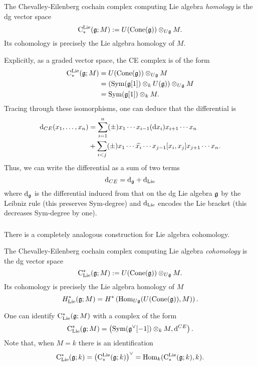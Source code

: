 \documentclass[11pt]{amsart}
\begin{document}
\begin{dfn}
The Chevalley-Eilenberg cochain complex computing Lie algebra {\em homology} is the dg vector space
\[
{\rm C}^{\rm Lie}_*(\mathfrak g ; M) := U({\rm Cone}(\mathfrak g)) \otimes_{U \mathfrak g} M .
\] 
Its cohomology is precisely the Lie algebra homology of $M$.
\end{dfn}

\begin{rmk}
Explicitly, as a graded vector space, the CE complex is of the form
\begin{align*}
{\rm C}^{\rm Lie}_*(\mathfrak g ; M) & = U({\rm Cone}(\mathfrak g)) \otimes_{U \mathfrak g} M  \\ & = \left({\rm Sym}(\mathfrak g[1]) \otimes_k U(\mathfrak g)\right) \otimes_{U \mathfrak g} M \\ &= {\rm Sym}(\mathfrak g[1]) \otimes_k M .
\end{align*}
Tracing through these isomorphisms, one can deduce that the differential is
\begin{align*}
{\rm d}_{CE} (x_1,\ldots, x_n) & = \sum_{i = 1}^n (\pm) x_1 \cdots x_{i-1} ({\rm d} x_i) x_{i+1} \cdots x_n \\ & + \sum_{i < j} (\pm) x_1\cdots \widehat{x_i} \cdots x_{j-1} [x_i,x_j] x_{j+1} \cdots x_n .
\end{align*}
Thus, we can write the differential as a sum of two terms $${\rm d}_{CE} = {\rm d}_{\mathfrak g} + {\rm d}_{\rm Lie}$$ where ${\rm d}_{\mathfrak g}$ is the differential induced from that on the dg Lie algebra $\mathfrak g$ by the Leibniz rule (this preserves Sym-degree) and ${\rm d}_{\rm Lie}$ encodes the Lie bracket (this decreases Sym-degree by one). 
\end{rmk}

\subsubsection{}

There is a completely analogous construction for Lie algebra cohomology. 

\begin{dfn}
The Chevalley-Eilenberg cochain complex computing Lie algebra {\em cohomology} is the dg vector space
\[
{\rm C}_{{\rm Lie}}^*(\mathfrak g ; M) := U({\rm Cone}(\mathfrak g)) \otimes_{U \mathfrak g} M .
\] 
Its cohomology is precisely the Lie algebra homology of $M$
\[
H_{\rm Lie}^*(\mathfrak g ; M) = H^*\left({\rm Hom}_{U \mathfrak g}(U({\rm Cone}(\mathfrak g)), M)\right) .
\]
\end{dfn}

\begin{rmk}
One can identify ${\rm C}_{{\rm Lie}}^*(\mathfrak g ; M)$ with a complex of the form
\[
{\rm C}_{{\rm Lie}}^*(\mathfrak g ; M) = \left({\rm Sym}(\mathfrak g^\vee[-1]) \otimes_k M , {\rm d}^{CE}\right) .
\]
Note that, when $M = k$ there is an identification 
\[
{\rm C}_{{\rm Lie}}^*(\mathfrak g ; k) = \left({\rm C}^{\rm Lie}_*(\mathfrak g ; k)\right)^\vee = {\rm Hom}_k({\rm C}^{\rm Lie}_*(\mathfrak g ;k), k) .
\] 
\end{rmk}
\end{document}
